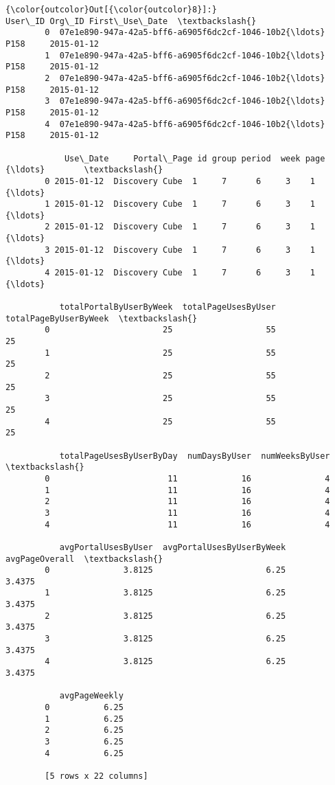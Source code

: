 \documentclass[11pt]{article}
\begin{document}
\begin{Verbatim}[commandchars=\\\{\}]
{\color{outcolor}Out[{\color{outcolor}8}]:}                                              User\_ID Org\_ID First\_Use\_Date  \textbackslash{}
        0  07e1e890-947a-42a5-bff6-a6905f6dc2cf-1046-10b2{\ldots}   P158     2015-01-12   
        1  07e1e890-947a-42a5-bff6-a6905f6dc2cf-1046-10b2{\ldots}   P158     2015-01-12   
        2  07e1e890-947a-42a5-bff6-a6905f6dc2cf-1046-10b2{\ldots}   P158     2015-01-12   
        3  07e1e890-947a-42a5-bff6-a6905f6dc2cf-1046-10b2{\ldots}   P158     2015-01-12   
        4  07e1e890-947a-42a5-bff6-a6905f6dc2cf-1046-10b2{\ldots}   P158     2015-01-12   
        
            Use\_Date     Portal\_Page id group period  week page      {\ldots}        \textbackslash{}
        0 2015-01-12  Discovery Cube  1     7      6     3    1      {\ldots}         
        1 2015-01-12  Discovery Cube  1     7      6     3    1      {\ldots}         
        2 2015-01-12  Discovery Cube  1     7      6     3    1      {\ldots}         
        3 2015-01-12  Discovery Cube  1     7      6     3    1      {\ldots}         
        4 2015-01-12  Discovery Cube  1     7      6     3    1      {\ldots}         
        
           totalPortalByUserByWeek  totalPageUsesByUser  totalPageByUserByWeek  \textbackslash{}
        0                       25                   55                     25   
        1                       25                   55                     25   
        2                       25                   55                     25   
        3                       25                   55                     25   
        4                       25                   55                     25   
        
           totalPageUsesByUserByDay  numDaysByUser  numWeeksByUser  \textbackslash{}
        0                        11             16               4   
        1                        11             16               4   
        2                        11             16               4   
        3                        11             16               4   
        4                        11             16               4   
        
           avgPortalUsesByUser  avgPortalUsesByUserByWeek  avgPageOverall  \textbackslash{}
        0               3.8125                       6.25          3.4375   
        1               3.8125                       6.25          3.4375   
        2               3.8125                       6.25          3.4375   
        3               3.8125                       6.25          3.4375   
        4               3.8125                       6.25          3.4375   
        
           avgPageWeekly  
        0           6.25  
        1           6.25  
        2           6.25  
        3           6.25  
        4           6.25  
        
        [5 rows x 22 columns]
\end{Verbatim}
            
\end{document}
